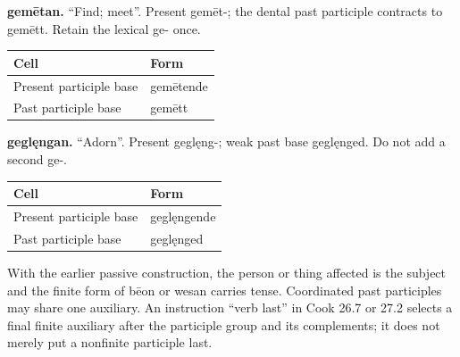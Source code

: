 \textbf{gemētan.} “Find; meet”. Present gemēt-; the dental past participle contracts to gemētt. Retain the lexical ge- once.

\par\begingroup
\fontsize{10.5}{13.2}\selectfont
\setlength{\LTleft}{0pt}\setlength{\LTright}{\fill}
\noindent
\begin{tabular}{@{}>{\raggedright\arraybackslash}p{74.31mm}>{\raggedright\arraybackslash}p{46.88mm}@{}}
\toprule
\textbf{Cell} & \textbf{Form} \\
\midrule
Present participle base & gemētende \\
Past participle base & gemētt \\
\bottomrule
\end{tabular}
\par\endgroup

\textbf{geglęngan.} “Adorn”. Present geglęng-; weak past base geglęnged. Do not add a second ge-.

\par\begingroup
\fontsize{10.5}{13.2}\selectfont
\setlength{\LTleft}{0pt}\setlength{\LTright}{\fill}
\noindent
\begin{tabular}{@{}>{\raggedright\arraybackslash}p{71.54mm}>{\raggedright\arraybackslash}p{49.65mm}@{}}
\toprule
\textbf{Cell} & \textbf{Form} \\
\midrule
Present participle base & geglęngende \\
Past participle base & geglęnged \\
\bottomrule
\end{tabular}
\par\endgroup

With the earlier passive construction, the person or thing affected is the subject and the finite form of bēon or wesan carries tense. Coordinated past participles may share one auxiliary. An instruction “verb last” in Cook 26.7 or 27.2 selects a final finite auxiliary after the participle group and its complements; it does not merely put a nonfinite participle last.

